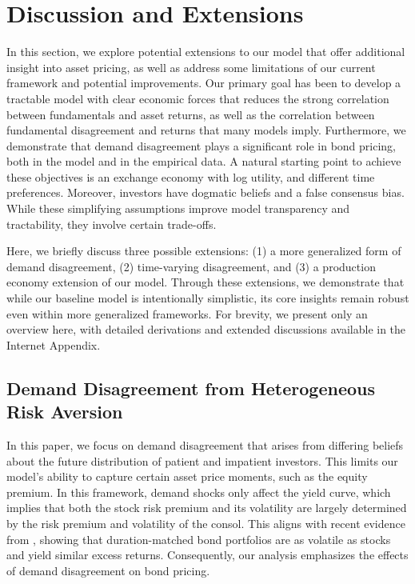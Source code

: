 \documentclass[preprint,11pt,authoryear]{elsarticle}
\theoremstyle{plain}
\begin{document}
 
\section{Discussion and Extensions}\label{sec:Extensions}

In this section, we explore potential extensions to our model that offer additional insight into asset pricing, as well as address some limitations of our current framework and potential improvements. Our primary goal has been to develop a tractable model with clear economic forces that reduces the strong correlation between fundamentals and asset returns, as well as the correlation between fundamental disagreement and returns that many models imply. Furthermore, we demonstrate that demand disagreement plays a significant role in bond pricing, both in the model and in the empirical data. A natural starting point to achieve these objectives is an exchange economy with log utility, and different time preferences.  Moreover, investors have dogmatic beliefs and a false consensus bias. While these simplifying assumptions improve model transparency and tractability, they involve certain trade-offs.

Here, we briefly discuss three possible extensions: (1) a more generalized form of demand disagreement, (2) time-varying disagreement, and (3) a production economy extension of our model. Through these extensions, we demonstrate that while our baseline model is intentionally simplistic, its core insights remain robust even within more generalized frameworks. For brevity, we present only an overview here, with detailed derivations and extended discussions available in the Internet Appendix.


 
\subsection{Demand Disagreement from Heterogeneous Risk Aversion} \label{sec:GeneralDD}

In this paper, we focus on demand disagreement that arises from differing beliefs about the future distribution of patient and impatient investors. This limits our model's ability to capture certain asset price moments, such as the equity premium. %
In this framework, demand shocks only affect the yield curve, which implies that both the stock risk premium and its volatility are largely determined by the risk premium and volatility of the consol. This aligns with recent evidence from \cite{JVB:2021}, showing that duration-matched bond portfolios are as volatile as stocks and yield similar excess returns. Consequently, our analysis emphasizes the effects of demand disagreement on bond pricing.
\end{document}
